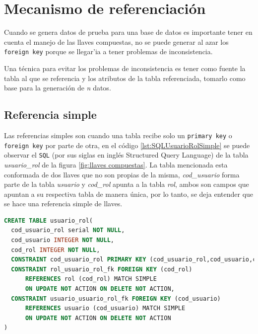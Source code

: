 \section{Mecanismo de referenciaci\'on}
Cuando se genera datos de prueba para una base de datos es importante tener en cuenta el manejo de las llaves compuestas, no se puede generar al azar los \texttt{foreign key} porque se llegar'ia a tener problemas de inconsistencia.

Una t\'ecnica para evitar los problemas de inconsistencia es tener como fuente la tabla al que se referencia y los atributos de la tabla referenciada,  tomarlo como base para la generaci\'on de \emph{n} datos.
\subsection{Referencia simple}
Las referencias simples son cuando una tabla recibe solo un \texttt{primary key} o \texttt{foreign key} por parte de otra, en el c\'odigo \ref{lst:SQLUsuarioRolSimple} se puede observar el  \texttt{SQL} (por sus siglas en ingl\'es Structured Query Language) de la tabla \textit{usuario\_rol} de la figura \ref{fig:llaves compuestas}.  La tabla mencionada esta conformada de dos llaves que no son propias de la misma, \textit{cod\_usuario} forma parte de la tabla \textit{usuario} y \textit{cod\_rol} apunta a la tabla \textit{rol}, ambos son campos que apuntan a su respectiva tabla de manera \'unica, por lo tanto, se deja entender que se hace una referencia simple de llaves.

\begin{lstlisting}[caption={Referencia simple},label={lst:SQLUsuarioRolSimple},language=sql]
CREATE TABLE usuario_rol(
  cod_usuario_rol serial NOT NULL,
  cod_usuario INTEGER NOT NULL,
  cod_rol INTEGER NOT NULL,
  CONSTRAINT cod_usuario_rol PRIMARY KEY (cod_usuario_rol,cod_usuario,cod_rol),
  CONSTRAINT rol_usuario_rol_fk FOREIGN KEY (cod_rol)
      REFERENCES rol (cod_rol) MATCH SIMPLE
      ON UPDATE NOT ACTION ON DELETE NOT ACTION,
  CONSTRAINT usuario_usuario_rol_fk FOREIGN KEY (cod_usuario)
      REFERENCES usuario (cod_usuario) MATCH SIMPLE
      ON UPDATE NOT ACTION ON DELETE NOT ACTION
)
\end{lstlisting}
